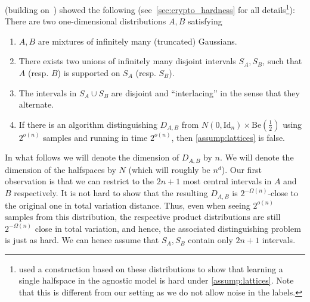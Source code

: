 \documentclass{theoretics}
\newcommand*{\Id}{\mathrm{Id}}
\newcommand{\Be}[1]{\mathrm{Be}(#1)}
\begin{document}
\cite{tiegel_agnostic_lattices} (building on~\cite{CLWE}) showed the following (see~\cref{sec:crypto_hardness} for all details\footnote{\cite{tiegel_agnostic_lattices} used a construction based on these distributions to show that learning a single halfspace in the agnostic model is hard under \cref{assump:lattices}. Note that this is different from our setting as we do not allow noise in the labels.}): There are two one-dimensional distributions $A,B$ satisfying
\begin{enumerate}
    \item $A,B$ are mixtures of infinitely many (truncated) Gaussians.
    \item There exists two unions of infinitely many disjoint intervals $S_A,S_B$, such that $A$ (resp. $B$) is supported on $S_A$ (resp. $S_B$).
    \item The intervals in $S_A \cup S_B$ are disjoint and ``interlacing'' in the sense that they alternate.
    \item If there is an algorithm distinguishing $D_{A,B}$ from $N(0,\Id_n) \times \Be{\tfrac 1 2}$ using $2^{o(n)}$ samples and running in time $2^{o(n)}$, then \cref{assump:lattices} is false.
\end{enumerate}
In what follows we will denote the dimension of $D_{A,B}$ by $n$.
We will denote the dimension of the halfspaces by $N$ (which will roughly be $n^d$).
Our first observation is that we can restrict to the $2n+1$ most central intervals in $A$ and $B$ respectively.
It is not hard to show that the resulting $D_{A,B}$ is $2^{-\Omega(n)}$-close to the original one in total variation distance.
Thus, even when seeing $2^{o(n)}$ samples from this distribution, the respective product distributions are still $2^{-\Omega(n)}$ close in total variation, and hence, the associated distinguishing problem is just as hard.
We can hence assume that $S_A, S_B$ contain only $2n+1$ intervals.
\end{document}
